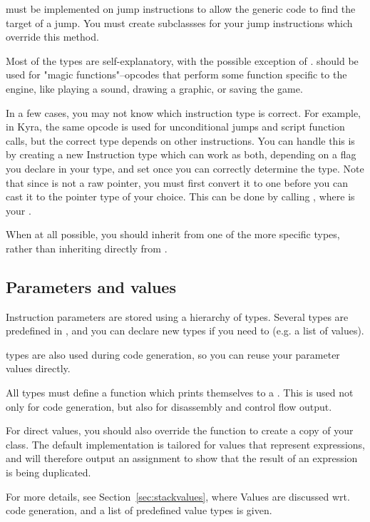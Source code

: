  must be implemented on jump instructions to allow the generic code to find the target of a jump. You must create subclassses for your jump instructions which override this method.

Most of the types are self-explanatory, with the possible exception of .  should be used for "magic functions"--opcodes that perform some function specific to the engine, like playing a sound, drawing a graphic, or saving the game.

In a few cases, you may not know which instruction type is correct. For example, in Kyra, the same opcode is used for unconditional jumps and script function calls, but the correct type depends on other instructions. You can handle this is by creating a new Instruction type which can work as both, depending on a flag you declare in your type, and set once you can correctly determine the type. Note that since  is not a raw pointer, you must first convert it to one before you can cast it to the pointer type of your choice. This can be done by calling , where  is your .

When at all possible, you should inherit from one of the more specific types, rather than inheriting directly from .

\subsection{Parameters and values}
\label{sec:parameter}
Instruction parameters are stored using a hierarchy of  types. Several types are predefined in , and you can declare new types if you need to (e.g. a list of values).

 types are also used during code generation, so you can reuse your parameter values directly.

All  types must define a  function which prints themselves to a . This is used not only for code generation, but also for disassembly and control flow output.

For direct values, you should also override the  function to create a copy of your class. The default implementation is tailored for values that represent expressions, and will therefore output an assignment to show that the result of an expression is being duplicated.

For more details, see Section~\vref{sec:stackvalues}, where Values are discussed wrt. code generation, and a list of predefined value types is given.

